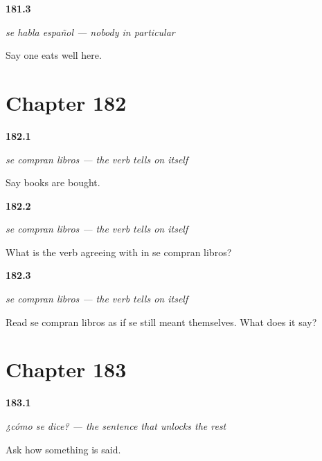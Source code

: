 \noindent\begin{minipage}[t]{\linewidth}
\raggedright
\hypertarget{review-ES-C52-se-habla-eat}{\textbf{181.3}} \emph{se habla español — nobody in particular}\par
\small Say one eats well here.
\end{minipage}\par\medskip

\section*{Chapter 182}

\noindent\begin{minipage}[t]{\linewidth}
\raggedright
\hypertarget{review-ES-C52-se-venden-plural}{\textbf{182.1}} \emph{se compran libros — the verb tells on itself}\par
\small Say books are bought.
\end{minipage}\par\medskip

\noindent\begin{minipage}[t]{\linewidth}
\raggedright
\hypertarget{review-ES-C52-se-venden-agree}{\textbf{182.2}} \emph{se compran libros — the verb tells on itself}\par
\small What is the verb agreeing with in se compran libros?
\end{minipage}\par\medskip

\noindent\begin{minipage}[t]{\linewidth}
\raggedright
\hypertarget{review-ES-C52-se-venden-origin}{\textbf{182.3}} \emph{se compran libros — the verb tells on itself}\par
\small Read se compran libros as if se still meant themselves. What does it say?
\end{minipage}\par\medskip

\section*{Chapter 183}

\noindent\begin{minipage}[t]{\linewidth}
\raggedright
\hypertarget{review-ES-C52-como-se-dice-ask}{\textbf{183.1}} \emph{¿cómo se dice? — the sentence that unlocks the rest}\par
\small Ask how something is said.
\end{minipage}\par\medskip

